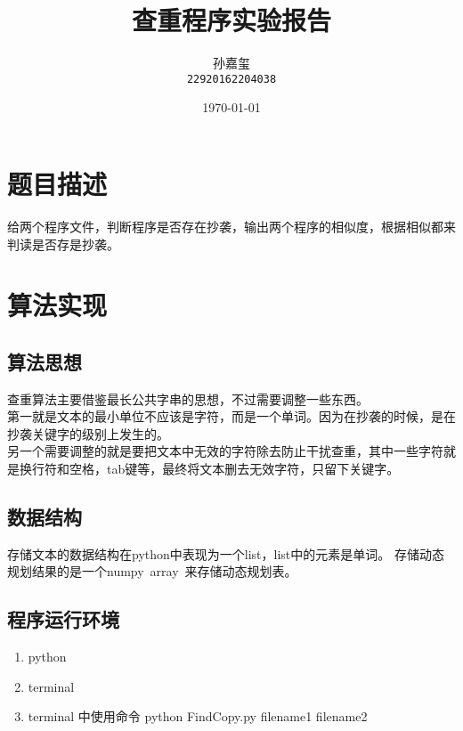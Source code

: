\documentclass[UTF8]{ctexart}
\author{孙嘉玺\\
\texttt{22920162204038}}
\date{\today}
\title{查重程序实验报告}
\begin{document}
\maketitle
\tableofcontents
\newpage

\section{题目描述}
给两个程序文件，判断程序是否存在抄袭，输出两个程序的相似度，根据相似都来判读是否存是抄袭。
\section{算法实现}
\subsection{算法思想}
查重算法主要借鉴最长公共字串的思想，不过需要调整一些东西。
\\第一就是文本的最小单位不应该是字符，而是一个单词。因为在抄袭的时候，是在抄袭关键字的级别上发生的。\\
另一个需要调整的就是要把文本中无效的字符除去防止干扰查重，其中一些字符就是换行符和空格，tab键等，最终将文本删去无效字符，只留下关键字。
\subsection{数据结构}
存储文本的数据结构在python中表现为一个list，list中的元素是单词。
存储动态规划结果的是一个numpy\ array\ 来存储动态规划表。
\subsection{程序运行环境}
\begin{enumerate}
\item python
\item terminal 
\item terminal 中使用命令 python FindCopy.py filename1 filename2 
\end{enumerate}
\end{document}
